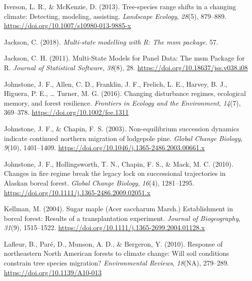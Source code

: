 \documentclass[a4paperpaper,]{article}
\begin{document}
\leavevmode\hypertarget{ref-iverson_tree-species_2013}{}%
Iverson, L. R., \& McKenzie, D. (2013). Tree-species range shifts in a
changing climate: Detecting, modeling, assisting. \emph{Landscape
Ecology}, \emph{28}(5), 879--889.
\url{https://doi.org/10.1007/s10980-013-9885-x}

\leavevmode\hypertarget{ref-jackson_multi-state_2018}{}%
Jackson, C. (2018). \emph{Multi-state modelling with R: The msm
package}. 57.

\leavevmode\hypertarget{ref-jackson_multi-state_2011}{}%
Jackson, C. H. (2011). Multi-State Models for Panel Data: The msm
Package for R. \emph{Journal of Statistical Software}, \emph{38}(8), 28.
\url{https://doi.org/10.18637/jss.v038.i08}

\leavevmode\hypertarget{ref-johnstone_changing_2016}{}%
Johnstone, J. F., Allen, C. D., Franklin, J. F., Frelich, L. E., Harvey,
B. J., Higuera, P. E., \ldots{} Turner, M. G. (2016). Changing
disturbance regimes, ecological memory, and forest resilience.
\emph{Frontiers in Ecology and the Environment}, \emph{14}(7), 369--378.
\url{https://doi.org/10.1002/fee.1311}

\leavevmode\hypertarget{ref-johnstone_non-equilibrium_2003}{}%
Johnstone, J. F., \& Chapin, F. S. (2003). Non-equilibrium succession
dynamics indicate continued northern migration of lodgepole pine.
\emph{Global Change Biology}, \emph{9}(10), 1401--1409.
\url{https://doi.org/10.1046/j.1365-2486.2003.00661.x}

\leavevmode\hypertarget{ref-johnstone_changes_2010}{}%
Johnstone, J. F., Hollingsworth, T. N., Chapin, F. S., \& Mack, M. C.
(2010). Changes in fire regime break the legacy lock on successional
trajectories in Alaskan boreal forest. \emph{Global Change Biology},
\emph{16}(4), 1281--1295.
\url{https://doi.org/10.1111/j.1365-2486.2009.02051.x}

\leavevmode\hypertarget{ref-kellman_sugar_2004}{}%
Kellman, M. (2004). Sugar maple (Acer saccharum Marsh.) Establishment in
boreal forest: Results of a transplantation experiment. \emph{Journal of
Biogeography}, \emph{31}(9), 1515--1522.
\url{https://doi.org/10.1111/j.1365-2699.2004.01128.x}

\leavevmode\hypertarget{ref-lafleur_response_2010}{}%
Lafleur, B., Paré, D., Munson, A. D., \& Bergeron, Y. (2010). Response
of northeastern North American forests to climate change: Will soil
conditions constrain tree species migration? \emph{Environmental
Reviews}, \emph{18}(NA), 279--289. \url{https://doi.org/10.1139/A10-013}
\end{document}
